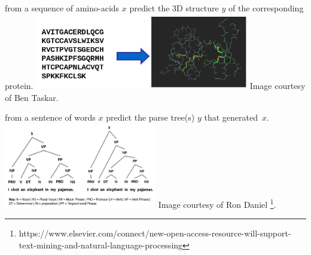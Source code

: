 \begin{example}
from a sequence of amino-acids $x$ predict the 3D structure $y$ of the
corresponding protein.
  \centering
    \includegraphics[width=0.7\textwidth]{img/proteinfolding}
Image courtesy of Ben Taskar.
\end{example}

\begin{example}
from a sentence of words $x$ predict the parse tree(s) $y$ that generated~$x$.
  \centering
    \includegraphics[width=0.5\textwidth]{img/parsetree}
Image courtesy of Ron
Daniel%
\footnote{https://www.elsevier.com/connect/new-open-access-resource-will-support-text-mining-and-natural-language-processing}.
\end{example}




